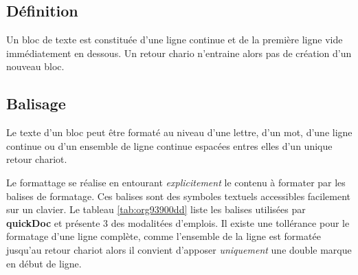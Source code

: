 \documentclass[a4paper,12pt]{article}
\begin{document}
\subsection{Définition}
\label{sec:orgac35a72}
Un bloc de texte est constituée d'une ligne continue et de la première ligne vide immédiatement en dessous. Un retour chario n'entraine alors pas de création d'un nouveau bloc.
\subsection{Balisage}
\label{sec:orgd1165fe}
Le texte d'un bloc peut être formaté au niveau d'une lettre, d'un mot, d'une ligne continue ou d'un ensemble de ligne continue espacées entres elles d'un unique retour chariot.

Le formattage se réalise en entourant \emph{explicitement} le contenu à formater par les balises de formatage. Ces balises sont des symboles textuels accessibles facilement sur un clavier. Le tableau \ref{tab:org93900dd} liste les balises utilisées par \textbf{quickDoc} et présente 3 des modalitées d'emplois. Il existe une tollérance pour le formatage d'une ligne complète, comme l'ensemble de la ligne est formatée jusqu'au retour chariot alors il convient d'apposer \emph{uniquement} une double marque en début de ligne.  
\end{document}
